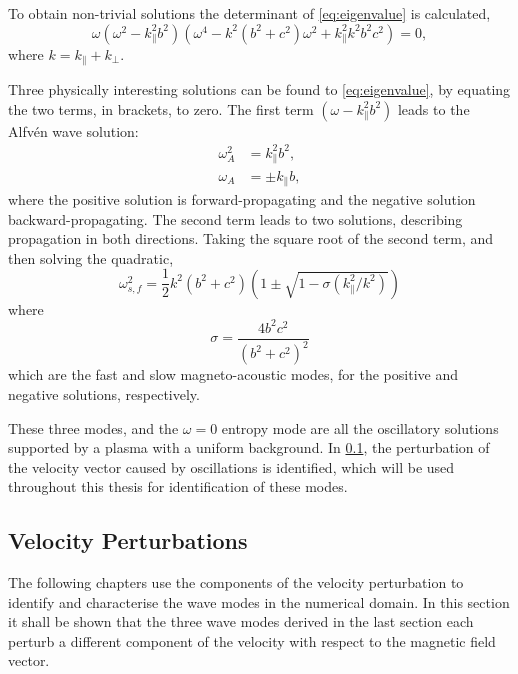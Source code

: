\documentclass[a4paper,12pt,fourier,authoryear,custommargin]{Classes/PhDThesisPSnPDF}
\begin{document}
To obtain non-trivial solutions the determinant of \cref{eq:eigenvalue} is calculated,
\begin{equation}
    \omega(\omega^2 - k_\parallel^2 b^2)\left( \omega^4 - k^2(b^2+c^2)\omega^2 + k^2_\parallel k^2b^2c^2 \right) = 0,
\end{equation}
where $k = k_\parallel + k_\perp$.

Three physically interesting solutions can be found to \cref{eq:eigenvalue}, by equating the two terms, in brackets, to zero.
The first term $(\omega - k_\parallel^2 b^2)$ leads to the Alfv\'en wave solution:
\begin{align}
\omega^2_A &= k^2_\parallel b^2,\\
\omega_A &= \pm k_\parallel b,
\label{eq:omegaA}
\end{align}
where the positive solution is forward-propagating and the negative solution backward-propagating.
The second term leads to two solutions, describing propagation in both directions. 
Taking the square root of the second term, and then solving the quadratic,
\begin{equation}
    \omega^2_{s,f} = \frac{1}{2}k^2(b^2+c^2)\left(1 \pm \sqrt{1 - \sigma (k^2_\parallel/k^2)}\right)
    \label{eq:omegasf}
\end{equation}
where
\begin{equation}
    \sigma=\frac{4b^2c^2}{(b^2 + c^2)^2}
    \label{eq:sigmasf}
\end{equation}
which are the fast and slow magneto-acoustic modes, for the positive and negative solutions, respectively.

These three modes, and the $\omega = 0$ entropy mode are all the oscillatory solutions supported by a plasma with a uniform background.
In \cref{sec:Vpert}, the perturbation of the velocity vector caused by oscillations is identified, which will be used throughout this thesis for identification of these modes.


\subsection{Velocity Perturbations}\label{sec:Vpert}

The following chapters use the components of the velocity perturbation to identify and characterise the wave modes in the numerical domain.
In this section it shall be shown that the three wave modes derived in the last section each perturb a different component of the velocity with respect to the magnetic field vector.
\end{document}
